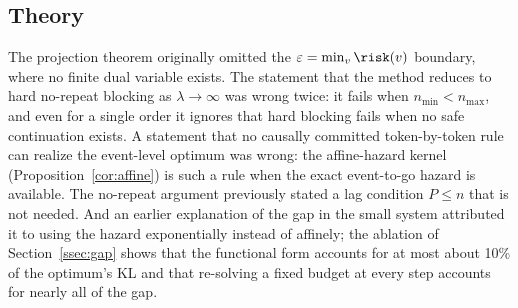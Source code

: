 \subsection*{Theory}
The projection theorem originally omitted the $\varepsilon=\min_v\risk(v)$ boundary, where no finite dual variable exists. The statement that the method reduces to hard no-repeat blocking as $\lambda\to\infty$ was wrong twice: it fails when $n_{\min}<n_{\max}$, and even for a single order it ignores that hard blocking fails when no safe continuation exists. A statement that no causally committed token-by-token rule can realize the event-level optimum was wrong: the affine-hazard kernel (Proposition~\ref{cor:affine}) is such a rule when the exact event-to-go hazard is available. The no-repeat argument previously stated a lag condition $P\le n$ that is not needed. And an earlier explanation of the gap in the small system attributed it to using the hazard exponentially instead of affinely; the ablation of Section~\ref{ssec:gap} shows that the functional form accounts for at most about 10\% of the optimum's KL and that re-solving a fixed budget at every step accounts for nearly all of the gap.

